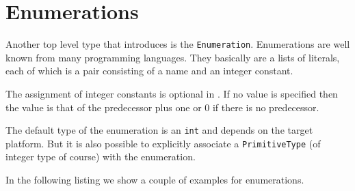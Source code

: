 \section{Enumerations}

Another top level type that \eTrice{} introduces is the \texttt{Enumeration}.
Enumerations are well known from many programming languages. They basically are a lists
of literals, each of which is a pair consisting of a name and an integer constant.

The assignment of integer constants is optional in \eTrice{}. If no value is specified
then the value is that of the predecessor plus one or 0 if there is no predecessor.

The default type of the enumeration is an \texttt{int} and depends on the target platform.
But it is also possible to explicitly associate a \texttt{PrimitiveType} (of integer type of course)
with the enumeration.

In the following listing we show a couple of examples for enumerations.


